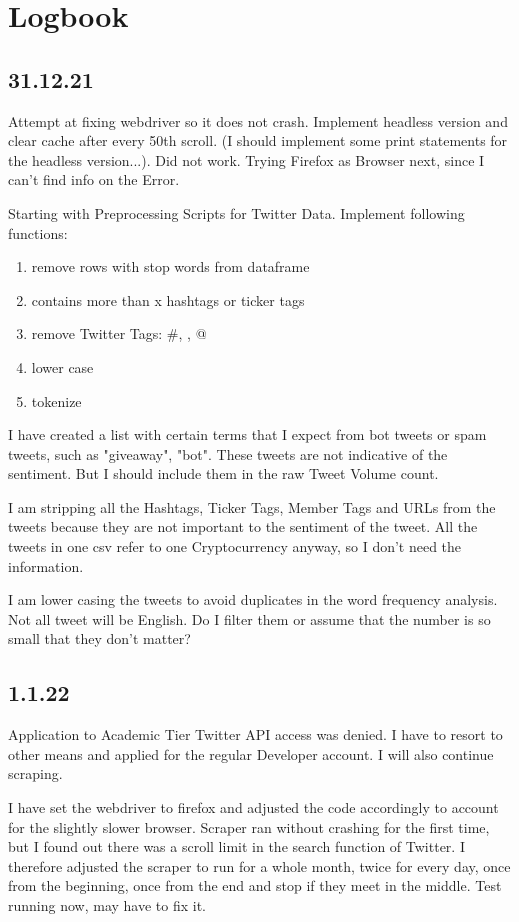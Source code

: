 \section{Logbook}

\subsection{31.12.21}
Attempt at fixing webdriver so it does not crash. Implement headless version and clear cache after every 50th scroll. (I should implement some print statements for the headless version...). Did not work. Trying Firefox as Browser next, since I can't find info on the Error.

Starting with Preprocessing Scripts for Twitter Data. Implement following functions:
\begin{enumerate}
  \item remove rows with stop words from dataframe
  \item contains more than x hashtags or ticker tags
  \item remove Twitter Tags: \#, \textdollar, @ 
  \item lower case 
  \item tokenize
\end{enumerate}

I have created a list with certain terms that I expect from bot tweets or spam tweets, such as "giveaway", "bot". These tweets are not indicative of the sentiment. But I should include them in the raw Tweet Volume count. 

I am stripping all the Hashtags, Ticker Tags, Member Tags and URLs from the tweets because they are not important to the sentiment of the tweet. All the tweets in one csv refer to one Cryptocurrency anyway, so I don't need the information.

I am lower casing the tweets to avoid duplicates in the word frequency analysis.
Not all tweet will be English. Do I filter them or assume that the number is so small that they don't matter?

\subsection{1.1.22}
Application to Academic Tier Twitter API access was denied. I have to resort to other means and applied for the regular Developer account. I will also continue scraping.

I have set the webdriver to firefox and adjusted the code accordingly to account for the slightly slower browser. Scraper ran without crashing for the first time, but I found out there was a scroll limit in the search function of Twitter. 
I therefore adjusted the scraper to run for a whole month, twice for every day, once from the beginning, once from the end and stop if they meet in the middle. Test running now, may have to fix it.


